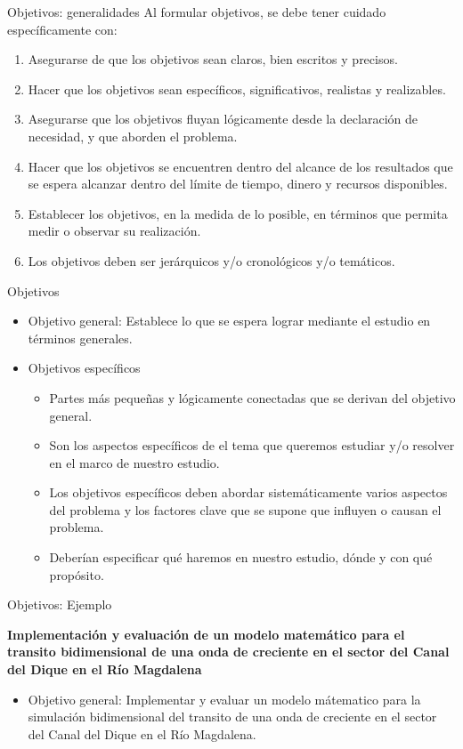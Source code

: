 \documentclass[
10pt,
aspectratio=169,
]{beamer}
\begin{document}
\begin{frame}{Objetivos: generalidades}
Al formular objetivos, se debe tener cuidado específicamente con:
\begin{enumerate}
\item Asegurarse de que los objetivos sean claros, bien escritos y precisos.
\item Hacer que los objetivos sean específicos, significativos, realistas y realizables.
\item Asegurarse que los objetivos fluyan lógicamente desde la declaración de necesidad,  y que aborden el problema.
\item Hacer que los objetivos se encuentren dentro del alcance de los resultados que se espera alcanzar dentro del límite de tiempo, dinero y recursos disponibles.
\item Establecer los objetivos, en la medida de lo posible, en términos que permita medir o observar su realizaci\'on.
\item Los objetivos deben ser jerárquicos y/o cronológicos y/o tem\'aticos. 
\end{enumerate}
\end{frame}

\begin{frame}{Objetivos}
\begin{itemize}
\item \alert{Objetivo general}: Establece lo que se espera lograr mediante el estudio en términos generales.
\item \alert{Objetivos espec\'ificos}
\begin{itemize}
\item Partes más pequeñas y lógicamente conectadas que se derivan del objetivo general.
\item Son los aspectos específicos de el tema que queremos estudiar y/o resolver en el marco de nuestro estudio.
\item Los objetivos específicos deben abordar sistemáticamente varios aspectos del problema y los factores clave que se supone que influyen o causan el problema.
\item Deberían especificar \alert{qué haremos} en nuestro estudio, \alert{dónde} y con qué \alert{propósito}.
\end{itemize}
\end{itemize}
\end{frame}

\begin{frame}{Objetivos: Ejemplo}
\begin{center}
\textbf{Implementaci\'on y evaluaci\'on de un modelo matem\'atico para el transito bidimensional de una onda de creciente en el sector del Canal del Dique en el R\'io Magdalena}
\end{center}
\begin{itemize}
\item \alert{Objetivo general}: Implementar y evaluar un modelo m\'atematico para la simulaci\'on bidimensional del transito de una onda de creciente en el sector del Canal del Dique en el R\'io Magdalena. 
\end{itemize}

\end{frame}
\end{document}
